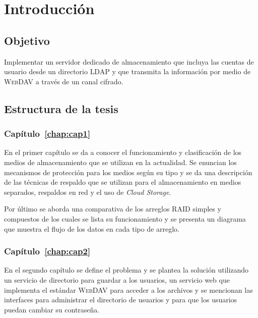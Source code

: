 \label{chap:intro}
\chapter*{Introducci\'{o}n}

  \section*{Objetivo}

Implementar un servidor dedicado de almacenamiento que incluya las cuentas de usuario desde un directorio \textsc{LDAP} y que transmita la informaci\'{o}n por medio de \textsc{WebDAV} a trav\'{e}s de un canal cifrado.

  \section*{Estructura de la tesis}

    \subsection*{Cap\'{i}tulo~\ref{chap:cap1}}

En el primer cap\'{i}tulo se da a conocer el funcionamiento y clasificaci\'{o}n de los medios de almacenamiento que se utilizan en la actualidad. Se enuncian los mecanismos de protecci\'{o}n para los medios seg\'{u}n su tipo y se da una descripci\'{o}n de las t\'{e}cnicas de respaldo que se utilizan para el almacenamiento en medios separados, respaldos en red y el uso de \textit{Cloud Storage}.

Por \'{u}ltimo se aborda una comparativa de los arreglos RAID simples y compuestos de los cuales se lista su funcionamiento y se presenta un diagrama que muestra el flujo de los datos en cada tipo de arreglo.

    \subsection*{Cap\'{i}tulo~\ref{chap:cap2}}

En el segundo cap\'{i}tulo se define el problema y se plantea la soluci\'{o}n utilizando un servicio de directorio para guardar a los usuarios, un servicio web que implementa el est\'{a}ndar \textsc{WebDAV} para acceder a los archivos y se mencionan las interfaces para administrar el directorio de usuarios y para que los usuarios puedan cambiar su contrase\~{n}a.

